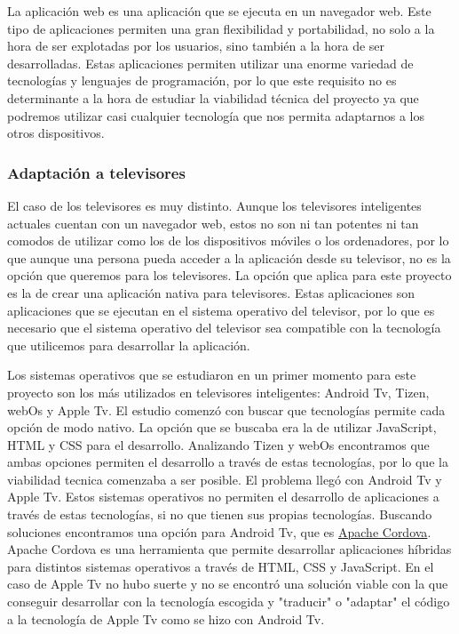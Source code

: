 La aplicación web es una aplicación que se ejecuta en un navegador web. Este tipo de aplicaciones permiten 
una gran flexibilidad y portabilidad, no solo a la hora de ser explotadas por los usuarios, sino también a la
hora de ser desarrolladas. Estas aplicaciones permiten utilizar una enorme variedad de tecnologías y lenguajes
de programación, por lo que este requisito no es determinante a la hora de estudiar la viabilidad técnica del proyecto
ya que podremos utilizar casi cualquier tecnología que nos permita adaptarnos a los otros dispositivos.

\subsubsection{Adaptación a televisores}
\label{subsubsec:analisis_estudio_viabilidad_tecnica_aplicacion_tv}

El caso de los televisores es muy distinto. Aunque los televisores inteligentes actuales cuentan con un navegador
web, estos no son ni tan potentes ni tan comodos de utilizar como los de los dispositivos móviles o los ordenadores, 
por lo que aunque una persona pueda acceder a la aplicación desde su televisor, no es la opción que queremos para 
los televisores. La opción que aplica para este proyecto es la de crear una aplicación nativa para televisores.
Estas aplicaciones son aplicaciones que se ejecutan en el sistema operativo del televisor, por lo que es necesario
que el sistema operativo del televisor sea compatible con la tecnología que utilicemos para desarrollar la aplicación.

Los sistemas operativos que se estudiaron en un primer momento para este proyecto son los más utilizados en 
televisores inteligentes: Android Tv, Tizen, webOs y Apple Tv. El estudio comenzó con buscar que tecnologías 
permite cada opción de modo nativo. La opción que se buscaba era la de utilizar JavaScript, HTML y CSS para
el desarrollo. Analizando Tizen y webOs encontramos que ambas opciones permiten el desarrollo a través de 
estas tecnologías, por lo que la viabilidad tecnica comenzaba a ser posible. El problema llegó con Android Tv
y Apple Tv. Estos sistemas operativos no permiten el desarrollo de aplicaciones a través de estas tecnologías,
si no que tienen sus propias tecnologías. Buscando soluciones encontramos una opción para Android Tv, que es
\href{https://cordova.apache.org/}{Apache Cordova}. Apache Cordova es una herramienta que permite desarrollar
aplicaciones híbridas para distintos sistemas operativos a través de HTML, CSS y JavaScript. En el caso de Apple Tv
no hubo suerte y no se encontró una solución viable con la que conseguir desarrollar con la tecnología escogida y 
"traducir" o "adaptar" el código a la tecnología de Apple Tv como se hizo con Android Tv. 

